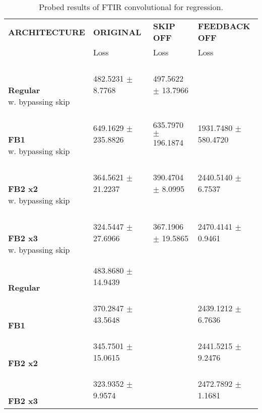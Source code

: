 
\begin{table}[ht]
    \centering
    \begin{tabular}{|>{\columncolor{gray!05}}l|l|l|l|}
        \hline
        \rowcolor{gray!20}
        \textbf{\footnotesize ARCHITECTURE} & \textbf{\footnotesize ORIGINAL} & \textbf{\footnotesize SKIP OFF} & \textbf{\footnotesize FEEDBACK OFF} \\

        \rowcolor{gray!20}
        & {\footnotesize Loss} & {\footnotesize Loss} & {\footnotesize Loss} \\
        \hline
\shortstack[l]{\\ {} \\ \textbf{Regular}\\{w. bypassing skip}} & 482.5231 $\pm$ 8.7768 & 497.5622 $\pm$ 13.7966 &  \\
 \hline 
\shortstack[l]{\\ {} \\ \textbf{FB1}\\{w. bypassing skip}} & 649.1629 $\pm$ 235.8826 & 635.7970 $\pm$ 196.1874 & 1931.7480 $\pm$ 580.4720 \\
 \hline 
\shortstack[l]{\\ {} \\ \textbf{FB2 x2}\\{w. bypassing skip}} & 364.5621 $\pm$ 21.2237 & 390.4704 $\pm$ 8.0995 & 2440.5140 $\pm$ 6.7537 \\
 \hline 
\shortstack[l]{\\ {} \\ \textbf{FB2 x3}\\{w. bypassing skip}} & 324.5447 $\pm$ 27.6966 & 367.1906 $\pm$ 19.5865 & 2470.4141 $\pm$ 0.9461 \\
 \hline 
\shortstack[l]{\\ {} \\ \textbf{Regular}\\{}} & 483.8680 $\pm$ 14.9439 &  &  \\
 \hline 
\shortstack[l]{\\ {} \\ \textbf{FB1}\\{}} & 370.2847 $\pm$ 43.5648 &  & 2439.1212 $\pm$ 6.7636 \\
 \hline 
\shortstack[l]{\\ {} \\ \textbf{FB2 x2}\\{}} & 345.7501 $\pm$ 15.0615 &  & 2441.5215 $\pm$ 9.2476 \\
 \hline 
\shortstack[l]{\\ {} \\ \textbf{FB2 x3}\\{}} & 323.9352 $\pm$ 9.9574 &  & 2472.7892 $\pm$ 1.1681 \\
 \hline 

    \end{tabular}
    \caption{Probed results of FTIR convolutional for regression.}
    \label{tab:ftir-cnn-regression}
\end{table}
